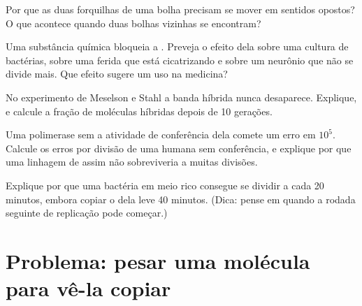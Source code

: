 \begin{exercise}[$\star\star$]\label{exo:g11:dna-replication:11}
Por que as duas forquilhas de uma bolha precisam se mover em sentidos
opostos? O que acontece quando duas bolhas vizinhas se encontram?
\end{exercise}

\begin{exercise}[$\star\star\star$]\label{exo:g11:dna-replication:12}
Uma substância química bloqueia a . Preveja o efeito
dela sobre uma cultura de bactérias, sobre uma ferida que está
cicatrizando e sobre um neurônio que não se divide mais. Que efeito
sugere um uso na medicina?
\end{exercise}

\begin{exercise}[$\star\star\star$]\label{exo:g11:dna-replication:13}
No experimento de Meselson e Stahl a banda híbrida nunca desaparece.
Explique, e calcule a fração de moléculas híbridas depois de 10
gerações.
\end{exercise}

\begin{exercise}[$\star\star\star$]\label{exo:g11:dna-replication:14}
Uma polimerase sem a atividade de conferência dela comete um erro em
$10^5$. Calcule os erros por divisão de uma  humana sem
conferência, e explique por que uma linhagem de  assim não
sobreviveria a muitas divisões.
\end{exercise}

\begin{exercise}[$\star\star\star$]\label{exo:g11:dna-replication:15}
Explique por que uma bactéria em meio rico consegue se dividir a cada
20 minutos, embora copiar o  dela leve 40 minutos. (Dica:
pense em quando a rodada seguinte de replicação pode começar.)
\end{exercise}

\section{Problema: pesar uma molécula para vê-la copiar}


